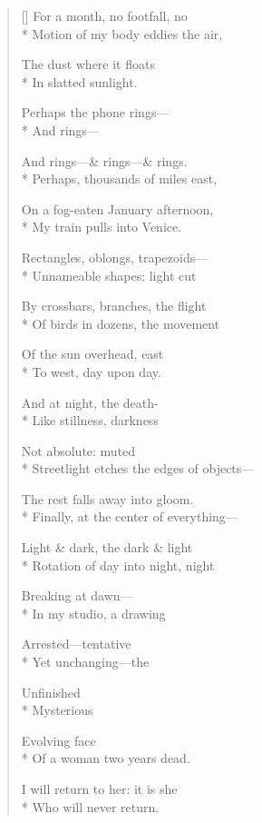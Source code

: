 \label{ch:absence}
\settowidth{\versewidth}{Streetlight etches the edges of objects---}
\begin{verse}[\versewidth]
For a month, no footfall, no\\*
Motion of my body eddies the air,

The dust where it floats\\*
In slatted sunlight.

Perhaps the phone rings---\\*
And rings---

And rings---\& rings---\& rings.\\*
Perhaps, thousands of miles east,

On a fog-eaten January afternoon,\\*
My train pulls into Venice.

Rectangles, oblongs, trapezoids---\\*
Unnameable shapes: light cut

By crossbars, branches, the flight\\*
Of birds in dozens, the movement

Of the sun overhead, east\\*
To west, day upon day.

And at night, the death-\\*
Like stillness, darkness

Not absolute: muted\\*
Streetlight etches the edges of objects---

The rest falls away into gloom.\\*
Finally, at the center of everything---

Light \& dark, the dark \& light\\*
Rotation of day into night, night

Breaking at dawn---\\*
In my studio, a drawing

Arrested---tentative\\*
Yet unchanging---the

Unfinished\\*
Mysterious

Evolving face\\*
Of a woman two years dead.

I will return to her: it is she\\*
Who will never return.
\end{verse}
